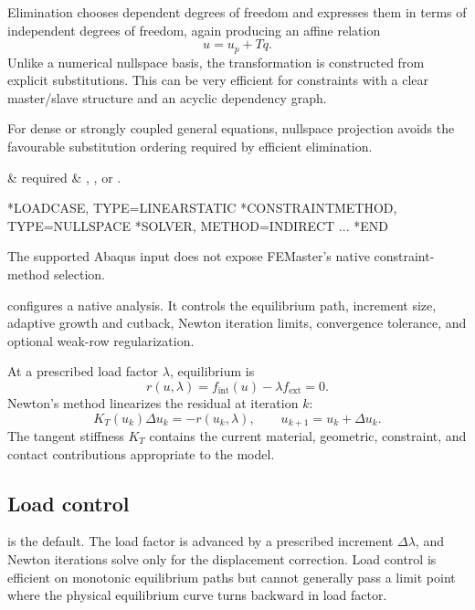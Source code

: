 Elimination chooses dependent degrees of freedom and expresses them in terms of independent degrees of freedom, again producing an affine relation
\[
u=u_p+Tq.
\]
Unlike a numerical nullspace basis, the transformation is constructed from explicit substitutions. This can be very efficient for constraints with a clear master/slave structure and an acyclic dependency graph.

For dense or strongly coupled general equations, nullspace projection avoids the favourable substitution ordering required by efficient elimination.

\begin{keywordparameters}
 & required & , , or . \\
\end{keywordparameters}

\exampleheading
\begin{dialectexamples}
\begin{femasterdeck}
*LOADCASE, TYPE=LINEARSTATIC
*CONSTRAINTMETHOD, TYPE=NULLSPACE
*SOLVER, METHOD=INDIRECT
...
*END
\end{femasterdeck}
\begin{noabaqus}
The supported Abaqus input does not expose FEMaster's native constraint-method selection.
\end{noabaqus}
\end{dialectexamples}


 configures a native  analysis. It controls the equilibrium path, increment size, adaptive growth and cutback, Newton iteration limits, convergence tolerance, and optional weak-row regularization.

At a prescribed load factor \(\lambda\), equilibrium is
\[
r(u,\lambda)=f_\mathrm{int}(u)-\lambda f_\mathrm{ext}=0.
\]
Newton's method linearizes the residual at iteration \(k\):
\[
K_T(u_k)\Delta u_k=-r(u_k,\lambda),
\qquad
u_{k+1}=u_k+\Delta u_k.
\]
The tangent stiffness \(K_T\) contains the current material, geometric, constraint, and contact contributions appropriate to the model.

\subsection*{Load control}

 is the default. The load factor is advanced by a prescribed increment \(\Delta\lambda\), and Newton iterations solve only for the displacement correction. Load control is efficient on monotonic equilibrium paths but cannot generally pass a limit point where the physical equilibrium curve turns backward in load factor.

